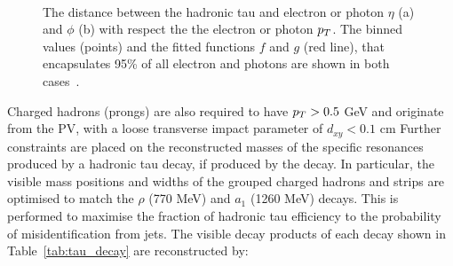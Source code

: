 \begin{figure}[!hbtp]
\centering
     \\
\caption{The distance between the hadronic tau and electron or photon $\eta$ (a) and $\phi$ (b) with respect the the electron or photon $p_{T}$. The binned values (points) and the fitted functions $f$ and $g$ (red line), that encapsulates 95\% of all electron and photons are shown in both cases~\cite{Sirunyan:2018pgf}.}
\label{fig:hps}
\end{figure}

Charged hadrons (prongs) are also required to have $p_{T} > 0.5$ GeV and originate from the \ac{PV}, with a loose transverse impact parameter of $d_{xy} < 0.1$ cm
Further constraints are placed on the reconstructed masses of the specific resonances produced by a hadronic tau decay, if produced by the decay.
In particular, the visible mass positions and widths of the grouped charged hadrons and strips are optimised to match the $\rho$ (770 MeV) and $a_1$ (1260 MeV) decays.
This is performed to maximise the fraction of hadronic tau efficiency to the probability of misidentification from jets.
The visible decay products of each decay shown in Table~\ref{tab:tau_decay} are reconstructed by:

